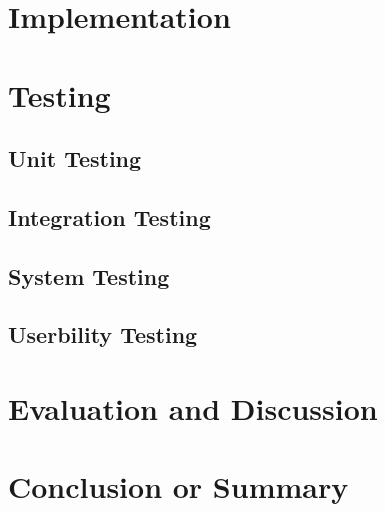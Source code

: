 \documentclass[11pt]{article}
\begin{document}
	\section{Implementation}
	
	\section{Testing}
	
	\subsection{Unit Testing}
	
	\subsection{Integration Testing}
	
	\subsection{System Testing}
	
	\subsection{Userbility Testing}
	
	\section{Evaluation and Discussion}
	
	\section{Conclusion or Summary}
	
	
	 
	
\end{document}
